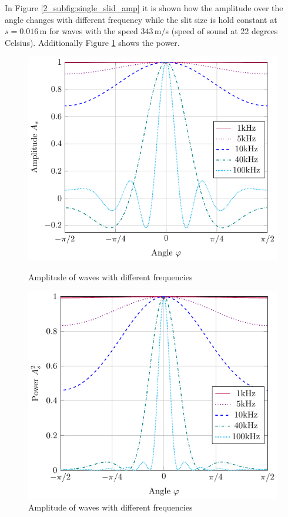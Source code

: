In Figure \ref{2_subfig:single_slid_amp} it is shown how the amplitude over the angle changes with different frequency while the slit size is hold constant at $s = 0.016 \,$m for waves with the speed $343 \,$m/s (speed of sound at 22 degrees Celsius). Additionally Figure \ref{2_subfig:single_slid_pow} shows the power. 
\begin{figure}
    \begin{minipage}{0.49\textwidth}
    \centering
    \includegraphics[width=\textwidth]{images/2_Preliminaries/Single_Slid_Frequency.pdf}
    \caption{Amplitude of waves with different frequencies}
    \label{2_subfig:single_slid_amp}
    \end{minipage}
    \begin{minipage}{0.49\textwidth}
    \centering
    \includegraphics[width=\textwidth]{images/2_Preliminaries/Single_Slid_Frequency_Power.pdf}
    \caption{Amplitude of waves with different frequencies}
     \label{2_subfig:single_slid_pow}
    \end{minipage}
\end{figure}

